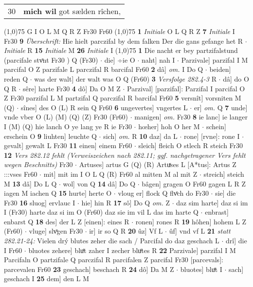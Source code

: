 \documentclass[8pt,a4paper,notitlepage]{article}
\begin{document}
\begin{table}[ht]
\begin{minipage}[t]{0.5\linewidth}
\begin{tabular}{rl}
30 & \textbf{mich wil} got sælden rîchen,\\ 
\end{tabular}
\scriptsize
\line(1,0){75} \newline
G I O L M Q R Z Fr30 Fr60 \newline
\line(1,0){75} \newline
\textbf{1} \textit{Initiale} O L Q R Z  \textbf{7} \textit{Initiale} I Fr30  \textbf{9} \textit{Überschrift:} Hie hielt parczifal by dem falken Der die gans gefange het R   $\cdot$ \textit{Initiale} R  \textbf{15} \textit{Initiale} M  \textbf{26} \textit{Initiale} I  \newline
\line(1,0){75} \newline
\textbf{1} Die nacht er bey partzifalstund (parcifale stvͦnt Fr30 ) Q (Fr30)  $\cdot$ die] ÷ie O  $\cdot$ naht] nah I  $\cdot$ Parzivale] parzifal I M parcifal O Z parzifale L parczifal R barcifal Fr60 \textbf{2} dâ] \textit{om.} I Do Q  $\cdot$ beiden] reden Q  $\cdot$ was der walt] der walt was O Q (Fr60) \textbf{3} \textit{Versfolge 282.4-3} R   $\cdot$ dâ] do O Q R  $\cdot$ sêre] harte Fr30 \textbf{4} dô] Da O M Z  $\cdot$ Parzival] [parzifal]: Parzifal I parcifal O Z Fr30 parzifal L M partzifal Q parczifal R barcifal Fr60 \textbf{5} versnît] vorsniten M (Q)  $\cdot$ sînes] des O (L) R sein Q Fr60 \textbf{6} ungevertes] vngertes L  $\cdot$ er] \textit{om.} Q \textbf{7} unde] vnde vber O (L) (M) (Q) (Z) Fr30 (Fr60)  $\cdot$ manigen] \textit{om.} Fr30 \textbf{8} ie lanc] ie langer I (M) (Q) hie lanch O ye lang ye R ie Fr30  $\cdot$ hœher] hoh O her M  $\cdot$ schein] erschein O \textbf{9} liuhten] leuchte Q  $\cdot$ sich] \textit{om.} R \textbf{10} daz] da L  $\cdot$ rone] [rvne]: rone I  $\cdot$ gevalt] gewalt L Fr30 \textbf{11} einen] einem Fr60  $\cdot$ sleich] fleich O stlech R steich Fr30 \textbf{12} \textit{Vers 282.12 fehlt (Verweiszeichen nach 282.11; ggf. nachgetragener Vers fehlt wegen Beschnitts)} Fr30   $\cdot$ Artuses] artus G (Q) (R) Artuͯses L [A*tus]: Artus Z :::vses Fr60  $\cdot$ mit] mit im I O L Q (R) Fr60 al mitten M al mit Z  $\cdot$ streich] steich M \textbf{13} dâ] Do L Q  $\cdot$ wol] von Q \textbf{14} dâ] Do Q  $\cdot$ bâgen] gragen O Fr60 gagen L R Z iagen M iachen Q \textbf{15} hurte] herte O  $\cdot$ vloug er] flock Q flvͦch do Fr30  $\cdot$ sie] die Fr30 \textbf{16} sluog] ervlauc I  $\cdot$ hie] hin R \textbf{17} sô] Do Q \textit{om.} Z  $\cdot$ daz sim harte] daz si im I (Fr30) harte daz si im O (Fr60) daz sie im vil L das im harte Q  $\cdot$ enbrast] enbarst Q \textbf{18} des] der L Z [einen]: eines R  $\cdot$ ronen] rones R \textbf{19} hôhen] hohem L Z (Fr60)  $\cdot$ vluge] slvͦgen Fr30  $\cdot$ ir] ir so Q R \textbf{20} ûz] Vf L  $\cdot$ ûf] vnd vf L \textbf{21} \textit{statt 282.21-24:} Vielen drý blutes zeher die sach / Parcifal do daz geschach L   $\cdot$ drî] die I Fr60  $\cdot$ bluotes zehere] bluͤt zaher I zecher bluͦtes R \textbf{22} Parzivale] parzifal I M Parcifaln O partzifale Q parczifal R parcifalen Z parcifal Fr30 [parcevals]: parcevalen Fr60 \textbf{23} geschach] beschach R \textbf{24} dô] Da M Z  $\cdot$ bluotes] bluͤt I  $\cdot$ sach] geschach I \textbf{25} dem] den L M 
\end{minipage}
\end{table}
\end{document}
